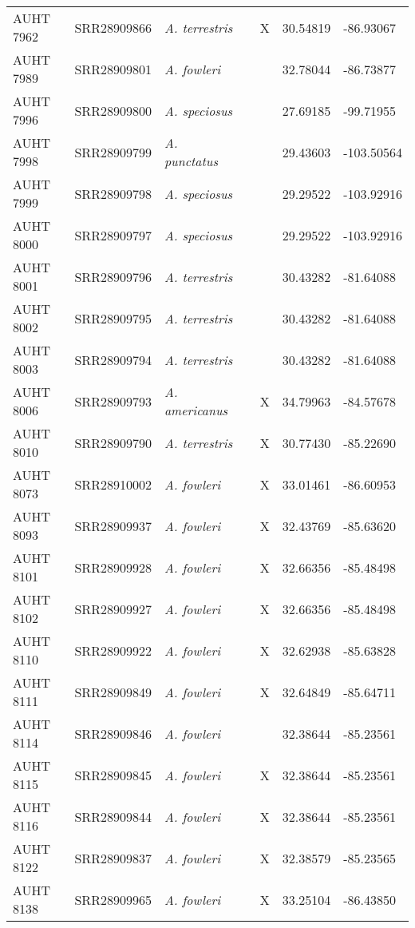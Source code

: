 \begin{longtable}{ lllllll }
AUHT 7962 & SRR28909866 & \textit{A. terrestris} &  & X & 30.54819 & -86.93067 \\ 
AUHT 7989 & SRR28909801 & \textit{A. fowleri} &  &  & 32.78044 & -86.73877 \\ 
AUHT 7996 & SRR28909800 & \textit{A. speciosus} &  &  & 27.69185 & -99.71955 \\ 
AUHT 7998 & SRR28909799 & \textit{A. punctatus} &  &  & 29.43603 & -103.50564 \\ 
AUHT 7999 & SRR28909798 & \textit{A. speciosus} &  &  & 29.29522 & -103.92916 \\ 
AUHT 8000 & SRR28909797 & \textit{A. speciosus} &  &  & 29.29522 & -103.92916 \\ 
AUHT 8001 & SRR28909796 & \textit{A. terrestris} &  &  & 30.43282 & -81.64088 \\ 
AUHT 8002 & SRR28909795 & \textit{A. terrestris} &  &  & 30.43282 & -81.64088 \\ 
AUHT 8003 & SRR28909794 & \textit{A. terrestris} &  &  & 30.43282 & -81.64088 \\ 
AUHT 8006 & SRR28909793 & \textit{A. americanus} &  & X & 34.79963 & -84.57678 \\ 
AUHT 8010 & SRR28909790 & \textit{A. terrestris} &  & X & 30.77430 & -85.22690 \\ 
AUHT 8073 & SRR28910002 & \textit{A. fowleri} &  & X & 33.01461 & -86.60953 \\ 
AUHT 8093 & SRR28909937 & \textit{A. fowleri} &  & X & 32.43769 & -85.63620 \\ 
AUHT 8101 & SRR28909928 & \textit{A. fowleri} &  & X & 32.66356 & -85.48498 \\ 
AUHT 8102 & SRR28909927 & \textit{A. fowleri} &  & X & 32.66356 & -85.48498 \\ 
AUHT 8110 & SRR28909922 & \textit{A. fowleri} &  & X & 32.62938 & -85.63828 \\ 
AUHT 8111 & SRR28909849 & \textit{A. fowleri} &  & X & 32.64849 & -85.64711 \\ 
AUHT 8114 & SRR28909846 & \textit{A. fowleri} &  &  & 32.38644 & -85.23561 \\ 
AUHT 8115 & SRR28909845 & \textit{A. fowleri} &  & X & 32.38644 & -85.23561 \\ 
AUHT 8116 & SRR28909844 & \textit{A. fowleri} &  & X & 32.38644 & -85.23561 \\ 
AUHT 8122 & SRR28909837 & \textit{A. fowleri} &  & X & 32.38579 & -85.23565 \\ 
AUHT 8138 & SRR28909965 & \textit{A. fowleri} &  & X & 33.25104 & -86.43850 \\ 

\end{longtable}
